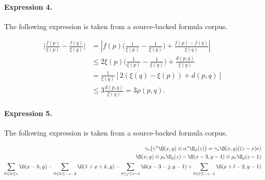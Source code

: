 \documentclass[11pt]{article}
\begin{document}
\paragraph{Expression 4.} The following expression is taken from a source-backed formula corpus.

\begin{align*}\bigl|\frac{f(p)}{\xi(p)}- \frac{f(q)}{\xi(q)}\bigr| & = |f(p)\bigl(\frac{1}{\xi(p)}-\frac{1}{\xi(q)} \bigr)+ \frac{f(p) - f(q)}{\xi(q)}| \\& \leq 2\xi(p)\bigl(\frac{1}{\xi(p)}-\frac{1}{\xi(q)} \bigr)+ \frac{d(p,q)}{\xi(q)}\\& = \frac{1}{\xi(q)}[2(\xi(q) - \xi(p)) + d(p,q)]\\& \leq 3 \frac{d(p,q)}{\xi(q)}=3\rho(p,q).\end{align*}

\paragraph{Expression 5.} The following expression is taken from a source-backed formula corpus.

\begin{align*}\gamma_*\big( \gamma^*\O(x,y)\otimes \alpha^*\O_\rho(z) \big) = \gamma_* \O(x,y)((z-x)e) \\\O(x,y)\otimes \rho_* \O_\rho(z) - \O(x-3,y-1)\otimes \rho_* \O_\rho(z-1) \\\sum_{0 \leq h \leq z } \O(x-h,y)-\sum_{0 \leq k \leq -z -2} \O(1+x+k,y)-\sum_{0 \leq j \leq z-1} \O(x-3-j,y-1)+\sum_{0 \leq l \leq -z-1} \O(x+l-2,y-1)\end{align*}
\end{document}
